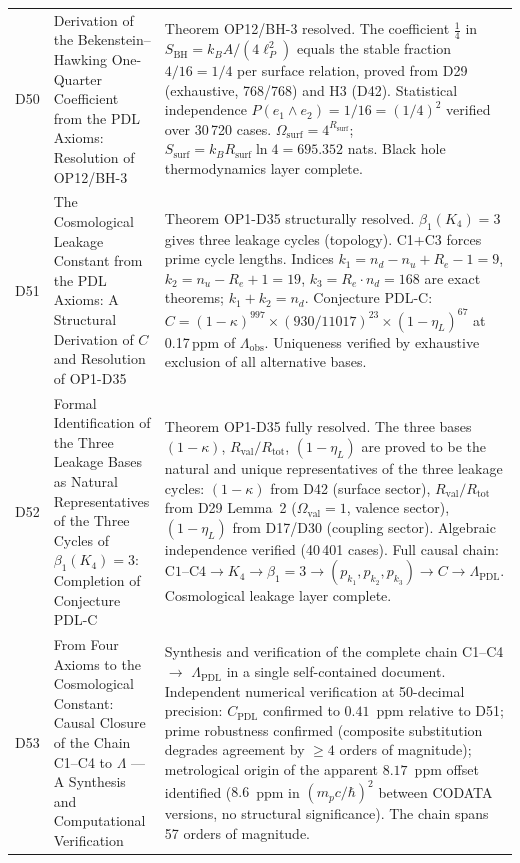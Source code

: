 \documentclass[11pt,a4paper]{article}
\newcommand{\Rval}{R_{\mathrm{val}}}
\theoremstyle{plain}
\theoremstyle{definition}
\theoremstyle{remark}
\newcommand{\Rsurf}{R_{\mathrm{surf}}}
\newcommand{\Rtot}{R_{\mathrm{tot}}}
\newcommand{\SBH}{S_{\mathrm{BH}}}
\begin{document}
\begin{longtable}{L{1.3cm}L{3.8cm}L{8.0cm}}
D50 & Derivation of the Bekenstein--Hawking One-Quarter Coefficient from the PDL Axioms: Resolution of OP12/BH-3~\cite{D50} & \textcolor{proofblue}{Theorem} OP12/BH-3 resolved. The coefficient $\tfrac{1}{4}$ in $\SBH = k_B A/(4\ell_P^2)$ equals the stable fraction $4/16 = 1/4$ per surface relation, proved from D29 (exhaustive, 768/768) and H3 (D42). Statistical independence $P(e_1\wedge e_2) = 1/16 = (1/4)^2$ verified over 30\,720 cases. $\Omega_{\mathrm{surf}} = 4^{\Rsurf}$; $S_{\mathrm{surf}} = k_B\Rsurf\ln 4 = 695.352$ nats. Black hole thermodynamics layer complete.\\[0.4em]
D51 & The Cosmological Leakage Constant from the PDL Axioms: A Structural Derivation of $C$ and Resolution of OP1-D35~\cite{D51} & \textcolor{proofblue}{Theorem} OP1-D35 structurally resolved. $\beta_1(K_4)=3$ gives three leakage cycles (topology). C1+C3 forces prime cycle lengths. Indices $k_1 = n_d - n_u + R_e - 1 = 9$, $k_2 = n_u - R_e + 1 = 19$, $k_3 = R_e \cdot n_d = 168$ are exact theorems; $k_1+k_2=n_d$. Conjecture PDL-C: $C = (1-\kappa)^{997} \times (930/11017)^{23} \times (1-\eta_L)^{67}$ at 0.17\,ppm of $\Lambda_{\mathrm{obs}}$. Uniqueness verified by exhaustive exclusion of all alternative bases.\\[0.4em]
D52 & Formal Identification of the Three Leakage Bases as Natural Representatives of the Three Cycles of $\beta_1(K_4)=3$: Completion of Conjecture PDL-C~\cite{D52} & \textcolor{proofblue}{Theorem} OP1-D35 fully resolved. The three bases $(1-\kappa)$, $\Rval/\Rtot$, $(1-\eta_L)$ are proved to be the natural and unique representatives of the three leakage cycles: $(1-\kappa)$ from D42 (surface sector), $\Rval/\Rtot$ from D29 Lemma~2 ($\Omega_{\mathrm{val}}=1$, valence sector), $(1-\eta_L)$ from D17/D30 (coupling sector). Algebraic independence verified (40\,401 cases). Full causal chain: $\mathrm{C1}\text{--}\mathrm{C4} \to K_4 \to \beta_1=3 \to (p_{k_1},p_{k_2},p_{k_3}) \to C \to \Lambda_{\mathrm{PDL}}$. Cosmological leakage layer complete.\\[0.4em]
D53 & From Four Axioms to the Cosmological Constant: Causal Closure of the Chain C1--C4 to $\Lambda$ --- A Synthesis and Computational Verification~\cite{D53} & \textcolor{proofblue}{Synthesis and verification} of the complete chain C1--C4 $\to$ $\Lambda_{\mathrm{PDL}}$ in a single self-contained document. Independent numerical verification at 50-decimal precision: $C_{\mathrm{PDL}}$ confirmed to $0.41$~ppm relative to D51; prime robustness confirmed (composite substitution degrades agreement by $\geq 4$ orders of magnitude); metrological origin of the apparent $8.17$~ppm offset identified ($8.6$~ppm in $(m_p c/\hbar)^2$ between CODATA versions, no structural significance). The chain spans 57 orders of magnitude.\\[0.4em]

\end{longtable}
\end{document}
